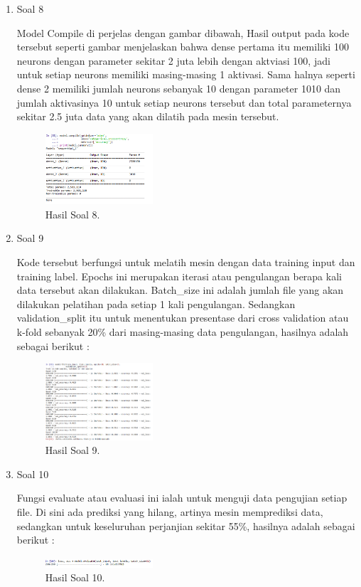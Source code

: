 \begin{enumerate}
	\item Soal 8
	\hfill\break
	
	Model Compile di perjelas dengan gambar dibawah, Hasil output pada kode tersebut seperti gambar  menjelaskan bahwa dense pertama itu memiliki 100 neurons dengan parameter sekitar 2 juta lebih dengan aktviasi 100, jadi untuk setiap neurons memiliki masing-masing 1 aktivasi. Sama halnya seperti dense 2 memiliki jumlah neurons sebanyak 10 dengan parameter 1010 dan jumlah aktivasinya 10 untuk setiap neurons tersebut dan total parameternya sekitar 2.5 juta data yang akan dilatih pada mesin tersebut.
	\begin{figure}[H]
	\centering
		\includegraphics[width=4cm]{figures/1174077/6/17.png}
		\caption{Hasil Soal 8.}
	\end{figure}

	\item Soal 9
	\hfill\break
	
	Kode tersebut berfungsi untuk melatih mesin dengan data training input dan training label. Epochs ini merupakan iterasi atau pengulangan berapa kali data tersebut akan dilakukan. Batch\_size ini adalah jumlah file yang akan dilakukan pelatihan pada setiap 1 kali pengulangan. Sedangkan validation\_split itu untuk menentukan presentase dari cross validation atau k-fold sebanyak 20\% dari masing-masing data pengulangan, hasilnya adalah sebagai berikut :
	\begin{figure}[H]
	\centering
		\includegraphics[width=4cm]{figures/1174077/6/18.png}
		\caption{Hasil Soal 9.}
	\end{figure}

	\item Soal 10
	\hfill\break
	
	Fungsi evaluate atau evaluasi ini ialah untuk menguji data pengujian setiap file. Di sini ada prediksi yang hilang, artinya mesin memprediksi data, sedangkan untuk keseluruhan perjanjian sekitar 55\%, hasilnya adalah sebagai berikut :
	\begin{figure}[H]
	\centering
		\includegraphics[width=4cm]{figures/1174077/6/19.png}
		\caption{Hasil Soal 10.}
	\end{figure}


\end{enumerate}
